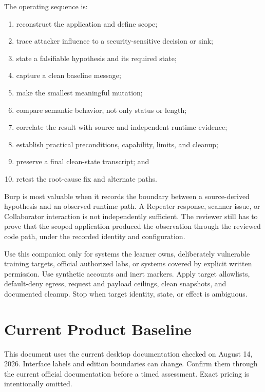 \documentclass[11pt]{article}
\begin{document}
The operating sequence is:
\begin{enumerate}
  \item reconstruct the application and define scope;
  \item trace attacker influence to a security-sensitive decision or sink;
  \item state a falsifiable hypothesis and its required state;
  \item capture a clean baseline message;
  \item make the smallest meaningful mutation;
  \item compare semantic behavior, not only status or length;
  \item correlate the result with source and independent runtime evidence;
  \item establish practical preconditions, capability, limits, and cleanup;
  \item preserve a final clean-state transcript; and
  \item retest the root-cause fix and alternate paths.
\end{enumerate}

\begin{insightbox}
Burp is most valuable when it records the boundary between a source-derived
hypothesis and an observed runtime path. A Repeater response, scanner issue, or
Collaborator interaction is not independently sufficient. The reviewer still
has to prove that the scoped application produced the observation through the
reviewed code path, under the recorded identity and configuration.
\end{insightbox}

\begin{warningbox}
Use this companion only for systems the learner owns, deliberately vulnerable
training targets, official authorized labs, or systems covered by explicit
written permission. Use synthetic accounts and inert markers. Apply target
allowlists, default-deny egress, request and payload ceilings, clean snapshots,
and documented cleanup. Stop when target identity, state, or effect is ambiguous.
\end{warningbox}

\section{Current Product Baseline}

This document uses the current desktop documentation checked on August 14,
2026. Interface labels and edition boundaries can change. Confirm them through
the current official documentation before a timed assessment. Exact pricing is
intentionally omitted.
\end{document}
